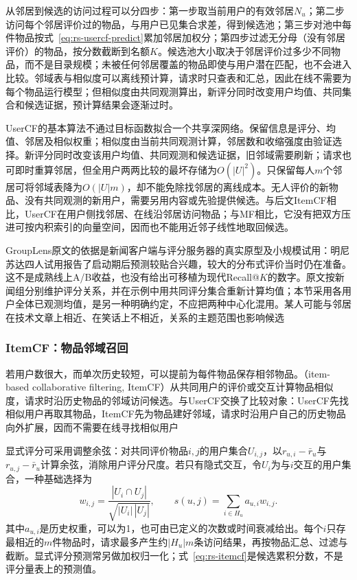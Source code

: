 从邻居到候选的访问过程可以分四步：第一步取当前用户的有效邻居$N_u$；第二步访问每个邻居评价过的物品，与用户已见集合求差，得到候选池；第三步对池中每件物品按式~\eqref{eq:rs-usercf-predict}累加邻居加权分；第四步过滤无分母（没有邻居评价）的物品，按分数截断到名额$K$。候选池大小取决于邻居评价过多少不同物品，而不是目录规模；未被任何邻居覆盖的物品即使与用户潜在匹配，也不会进入比较。邻域表与相似度可以离线预计算，请求时只查表和汇总，因此在线不需要为每个物品运行模型；但相似度由共同观测算出，新评分同时改变用户均值、共同集合和候选证据，预计算结果会逐渐过时。

UserCF的基本算法不通过目标函数拟合一个共享深网络。保留信息是评分、均值、邻居及相似权重；相似度由当前共同观测计算，邻居数和收缩强度由验证选择。新评分同时改变该用户均值、共同观测和候选证据，旧邻域需要刷新；请求也可即时重算邻居，但全用户两两比较的最坏存储为$O(|U|^2)$。只保留每人$m$个邻居可将邻域表降为$O(|U|m)$，却不能免除找邻居的离线成本。无人评价的新物品、没有共同观测的新用户，需要另用内容或先验提供候选。与后文ItemCF相比，UserCF在用户侧找邻居、在线沿邻居访问物品；与MF相比，它没有把双方压进可按内积索引的向量空间，因而也不能用近邻子线性地取回候选。

GroupLens原文的依据是新闻客户端与评分服务器的真实原型及小规模试用：明尼苏达四人试用报告了启动期后预测较贴合兴趣，较大的分布式评价当时仍在准备。这不是成熟线上A/B收益，也没有给出可移植为现代Recall@$K$的数字。原文按新闻组分别维护评分关系，并在示例中用共同评分集合重新计算均值；本节采用各用户全体已观测均值，是另一种明确约定，不应把两种中心化混用。某人可能与邻居在技术文章上相近、在笑话上不相近，关系的主题范围也影响候选

\subsubsection{ItemCF：物品邻域召回}
\label{sec:rs-itemcf}

若用户数很大，而单次历史较短，可以提前为每件物品保存相邻物品。（item-based collaborative filtering, ItemCF）从共同用户的评价或交互计算物品相似度，请求时沿历史物品的邻域访问候选。与UserCF交换了比较对象：UserCF先找相似用户再取其物品，ItemCF先为物品建好邻域，请求时沿用户自己的历史物品向外扩展，因而不需要在线寻找相似用户

显式评分可采用调整余弦：对共同评价物品$i,j$的用户集合$U_{i,j}$，以$r_{u,i}-\bar r_u$与$r_{u,j}-\bar r_u$计算余弦，消除用户评分尺度。若只有隐式交互，令$U_i$为与$i$交互的用户集合，一种基础选择为
\begin{equation}
 w_{i,j}=\frac{|U_i\cap U_j|}{\sqrt{|U_i|\,|U_j|}},
 \qquad s(u,j)=\sum_{i\in H_u}a_{u,i}w_{i,j}.
 \label{eq:rs-itemcf}
\end{equation}
其中$a_{u,i}$是历史权重，可以为1，也可由已定义的次数或时间衰减给出。每个$i$只存最相近的$m$件物品时，请求最多产生约$|H_u|m$条访问结果，再按物品汇总、过滤与截断。显式评分预测常另做加权归一化；式~\eqref{eq:rs-itemcf}是候选累积分数，不是评分量表上的预测值。

